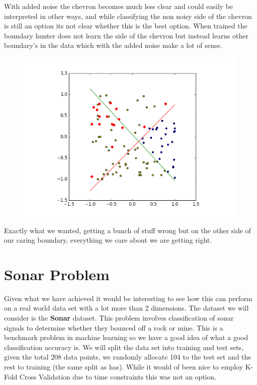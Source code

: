 \documentclass[notitlepage]{report}
\theoremstyle{definition}
\begin{document}
With added noise the chevron becomes much less clear and could easily be interpreted in other ways, and while classifying the non noisy side of the chevron is still an option its not clear whether this is the best option. When trained the boundary hunter does not learn the side of the chevron but instead learns other boundary's in the data which with the added noise make a lot of sense.

\begin{figure}[H]
  \centering
  \begin{minipage}[b]{0.8\textwidth}
    \includegraphics[width=\textwidth]{NoisyChev-BH-WithByas.png}
    \caption{}
  \end{minipage}
  \hfill
\end{figure}

Exactly what we wanted, getting a bunch of stuff wrong but on the other side of our caring boundary, everything we care about we are getting right. 

\chapter{Sonar Problem}
Given what we have achieved it would be interesting to see how this can perform on a real world data set with a lot more than 2 dimensions. The dataset we will consider is the \textbf{Sonar} dataset. This problem involves classification of sonar signals to determine whether they bounced off a rock or mine. This is a benchmark problem in machine learning so we have a good idea of what a good classification accuracy is. We will split the data set into training and test sets, given the total 208 data points, we randomly allocate 104 to the test set and the rest to training (the same split as \cite{gorman1988analysis} has). While it would of been nice to employ K-Fold Cross Validation due to time constraints this was not an option.\\
\end{document}
